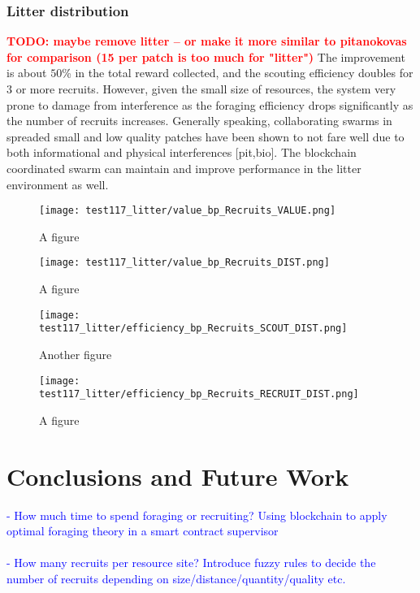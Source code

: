\documentclass[runningheads]{llncs}
\newcommand{\todo}[1]{\textcolor{red}{\textbf{TODO: #1}}}
\newcommand{\blue}[1]{\textcolor{blue}{#1}}
\begin{document}
\subsubsection{Litter distribution}
\todo{maybe remove litter -- or make it more similar to pitanokovas for comparison (15 per patch is too much for "litter")}
 The improvement is about $50$\% in the total reward collected, and the scouting efficiency doubles for $3$ or more recruits. However, given the small size of resources, the system very prone to damage from interference as the foraging efficiency drops significantly as the number of recruits increases. Generally speaking, collaborating swarms in spreaded small and low quality patches have been shown to not fare well due to both informational and physical interferences [pit,bio]. The blockchain coordinated swarm can maintain and improve performance in the litter environment as well.

\begin{figure}
\centering
\begin{minipage}{.495\textwidth}
  \centering
  \texttt{[image: test117\_litter/value\_bp\_Recruits\_VALUE.png]}
  \caption{A figure}
  \label{fig:test1}
\end{minipage}
\begin{minipage}{.495\textwidth}
  \centering
  \texttt{[image: test117\_litter/value\_bp\_Recruits\_DIST.png]}
  \caption{A figure}
  \label{fig:test1}
\end{minipage}
\end{figure}

\begin{figure}
\centering
\begin{minipage}{.495\textwidth}
  \centering
  \texttt{[image: test117\_litter/efficiency\_bp\_Recruits\_SCOUT\_DIST.png]}
  \caption{Another figure}
  \label{fig:test2}
\end{minipage}
\begin{minipage}{.495\textwidth}
  \centering
  \texttt{[image: test117\_litter/efficiency\_bp\_Recruits\_RECRUIT\_DIST.png]}
  \caption{A figure}
  \label{fig:test1}
\end{minipage}
\end{figure}

\section{Conclusions and Future Work}
\label{sec:conclusion}

\blue{
- How much time to spend foraging or recruiting? Using blockchain to apply optimal foraging theory in a smart contract supervisor \\ \\
- How many recruits per resource site? Introduce fuzzy rules to decide the number of recruits depending on size/distance/quantity/quality etc.\\ \\
\lipsum[1-2]
}
\end{document}
